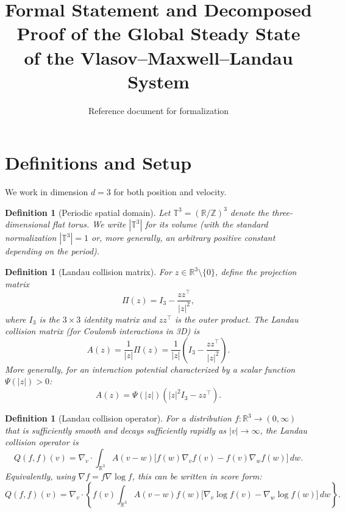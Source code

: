 \documentclass[11pt]{article}
\title{Formal Statement and Decomposed Proof of the Global Steady State \\
of the Vlasov--Maxwell--Landau System}
\author{Reference document for formalization}
\date{}
\newcommand{\R}{\mathbb{R}}
\newcommand{\T}{\mathbb{T}}
\newtheorem{definition}[theorem]{Definition}
\begin{document}
\maketitle

\tableofcontents
\newpage

\section{Definitions and Setup}
\label{sec:setup}

We work in dimension $d = 3$ for both position and velocity.

\begin{definition}[Periodic spatial domain]
\label{def:torus}
Let $\T^3 = (\R / \mathbb{Z})^3$ denote the three-dimensional flat torus. We write $|\T^3|$ for its volume (with the standard normalization $|\T^3| = 1$ or, more generally, an arbitrary positive constant depending on the period).
\end{definition}

\begin{definition}[Landau collision matrix]
\label{def:landau_matrix}
For $z \in \R^3 \setminus \{0\}$, define the \emph{projection matrix}
\[
\Pi(z) = I_3 - \frac{z z^\top}{|z|^2},
\]
where $I_3$ is the $3 \times 3$ identity matrix and $z z^\top$ is the outer product. The \emph{Landau collision matrix} (for Coulomb interactions in 3D) is
\[
A(z) = \frac{1}{|z|} \Pi(z) = \frac{1}{|z|}\left(I_3 - \frac{z z^\top}{|z|^2}\right).
\]
More generally, for an interaction potential characterized by a scalar function $\Psi(|z|) > 0$:
\[
A(z) = \Psi(|z|)\left(|z|^2 I_3 - z z^\top\right).
\]
\end{definition}

\begin{definition}[Landau collision operator]
\label{def:landau_operator}
For a distribution $f : \R^3 \to (0, \infty)$ that is sufficiently smooth and decays sufficiently rapidly as $|v| \to \infty$, the \emph{Landau collision operator} is
\[
Q(f, f)(v) = \nabla_v \cdot \int_{\R^3} A(v - w) \big[ f(w) \nabla_v f(v) - f(v) \nabla_w f(w) \big] \, dw.
\]
Equivalently, using $\nabla f = f \nabla \log f$, this can be written in \emph{score form}:
\[
Q(f, f)(v) = \nabla_v \cdot \left\{ f(v) \int_{\R^3} A(v - w) f(w) \big[ \nabla_v \log f(v) - \nabla_w \log f(w) \big] \, dw \right\}.
\]
\end{definition}
\end{document}
